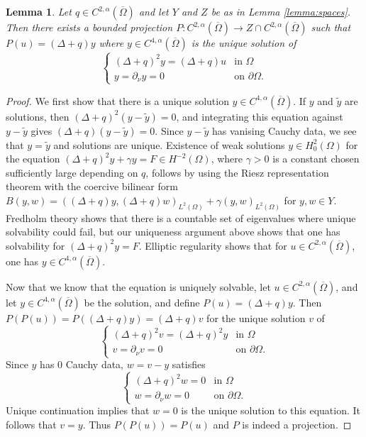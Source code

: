 \documentclass[11pt,a4paper]{amsart}
\newtheorem{Lemma}[Theorem]{Lemma}
\theoremstyle{definition}
\numberwithin{equation}{section}
\newcommand{\ol}[1]{\overline{#1}}
\newcommand{\p}{\partial}
\newcommand{\Om}{\Omega}
\begin{document}
\begin{Lemma}\label{lemma:projection}
Let $q\in C^{2,\alpha}(\ol{\Om})$ and let $Y$ and $Z$ be as in Lemma \ref{lemma:spaces}.
Then there exists a bounded projection $P\colon C^{2,\alpha}(\ol{\Om})\to Z\cap C^{2,\alpha}(\ol{\Om})$ such that $P(u) = (\Delta + q)y$ where $y \in C^{4,\alpha}(\ol{\Om})$ is the unique solution of 
\begin{equation*}
	\begin{cases}
		(\Delta + q)^2 y = (\Delta+q)u &\text{in }\Omega \\
		y = \p_{\nu}y = 0 &\text{on }\p\Om.
	\end{cases}
\end{equation*}
\end{Lemma}
\begin{proof}
We first show that there is a unique solution $y \in C^{4,\alpha}(\ol{\Om})$.
If $y$ and $\tilde{y}$ are solutions, then $(\Delta+q)^2(y-\tilde{y})=0$, and integrating this equation against $y-\tilde{y}$ gives $(\Delta+q)(y-\tilde{y})=0$.
Since $y-\tilde{y}$ has vanising Cauchy data, we see that $y=\tilde{y}$ and solutions are unique.
Existence of weak solutions $y \in H^2_0(\Omega)$ for the equation $(\Delta+q)^2 y + \gamma y = F \in H^{-2}(\Omega)$, where $\gamma > 0$ is a constant chosen sufficiently large depending on $q$, follows by using the Riesz representation theorem with the coercive bilinear form $B(y,w) = ((\Delta+q)y, (\Delta+q)w)_{L^2(\Omega)} + \gamma(y,w)_{L^2(\Omega)}$ for $y, w \in Y$.
Fredholm theory shows that there is a countable set of eigenvalues where unique solvability could fail, but our uniqueness argument above shows that one has solvability for $(\Delta+q)^2 y = F$.
Elliptic regularity shows that for $u \in C^{2,\alpha}(\ol{\Om})$, one has $y \in C^{4,\alpha}(\ol{\Om})$.

Now that we know that the equation is uniquely solvable, let $u \in C^{2,\alpha}(\ol{\Om})$, and let $y \in C^{4,\alpha}(\ol{\Om})$ be the solution, and define $P(u) = (\Delta+q)y$.
Then $P(P(u)) = P((\Delta + q)y) = (\Delta+q)v$ for the unique solution  $v$ of 
\begin{equation*}
	\begin{cases}
		(\Delta + q)^2 v = (\Delta+q)^2y &\text{in }\Omega \\
		v = \p_{\nu}v = 0 &\text{on }\p\Om.
	\end{cases}
\end{equation*}
Since $y$ has $0$ Cauchy data, $w=v-y$ satisfies
\begin{equation*}
	\begin{cases}
		(\Delta + q)^2 w = 0 &\text{in }\Omega \\
		w = \p_{\nu}w = 0 &\text{on }\p\Om.
	\end{cases}
\end{equation*}
Unique continuation implies that $w=0$ is the unique solution to this equation.
It follows that $v=y$.
Thus $P(P(u))=P(u)$ and $P$ is indeed a projection.
\end{proof}
\end{document}
